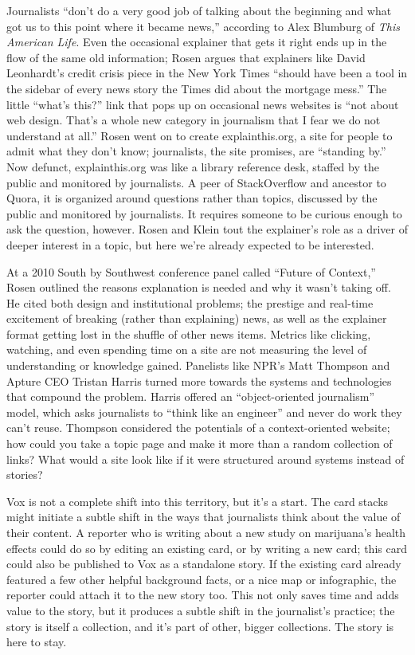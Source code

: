 Journalists ``don't do a very good job of talking about the beginning and what got us to this point where it became news,'' according to Alex Blumburg of \emph{This American Life}.\autocite{rosen_national_2008} Even the occasional explainer that gets it right ends up in the flow of the same old information; Rosen argues that explainers like David Leonhardt's credit crisis piece in the New York Times ``should have been a tool in the sidebar of every news story the Times did about the mortgage mess.'' The little ``what's this?'' link that pops up on occasional news websites is ``not about web design. That's a whole new category in journalism that I fear we do not understand at all.'' Rosen went on to create explainthis.org, a site for people to admit what they don't know; journalists, the site promises, are ``standing by.''\autocite{_explainthis.org_2010} Now defunct, explainthis.org was like a library reference desk, staffed by the public and monitored by journalists. A peer of StackOverflow and ancestor to Quora, it is organized around questions rather than topics, discussed by the public and monitored by journalists. It requires someone to be curious enough to ask the question, however. Rosen and Klein tout the explainer's role as a driver of deeper interest in a topic, but here we're already expected to be interested.

At a 2010 South by Southwest conference panel called ``Future of Context,'' Rosen outlined the reasons explanation is needed and why it wasn't taking off. He cited both design and institutional problems; the prestige and real-time excitement of breaking (rather than explaining) news, as well as the explainer format getting lost in the shuffle of other news items.\autocite{rosen_news_2010} Metrics like clicking, watching, and even spending time on a site are not measuring the level of understanding or knowledge gained. Panelists like NPR's Matt Thompson and Apture CEO Tristan Harris turned more towards the systems and technologies that compound the problem. Harris offered an ``object-oriented journalism'' model, which asks journalists to ``think like an engineer'' and never do work they can't reuse. Thompson considered the potentials of a context-oriented website; how could you take a topic page and make it more than a random collection of links? What would a site look like if it were structured around systems instead of stories?\autocites[See][]{rosen_news_2010}{myers_liveblogging_2010}{hu_contextualizing_2010}

Vox is not a complete shift into this territory, but it's a start. The card stacks might initiate a subtle shift in the ways that journalists think about the value of their content. A reporter who is writing about a new study on marijuana's health effects could do so by editing an existing card, or by writing a new card; this card could also be published to Vox as a standalone story. If the existing card already featured a few other helpful background facts, or a nice map or infographic, the reporter could attach it to the new story too. This not only saves time and adds value to the story, but it produces a subtle shift in the journalist's practice; the story is itself a collection, and it's part of other, bigger collections. The story is here to stay.

